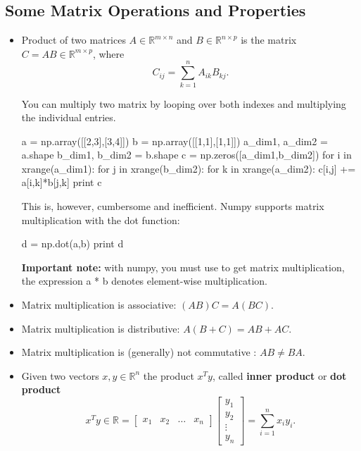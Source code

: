 \subsection{Some Matrix Operations and Properties}
\begin{itemize}
\item Product of two matrices $A \in \mathbb{R}^{m\times n}$ and $B \in \mathbb{R}^{n\times p}$
is the matrix $C=AB \in \mathbb{R}^{m\times p}$, where 
\begin{equation*}
C_{ij}=\sum\limits_{k=1}^{n}A_{ik}B_{kj}.
\end{equation*}

\begin{exercise}
You can multiply two matrix by looping over both indexes and multiplying the individual entries.
\begin{python}
a = np.array([[2,3],[3,4]])
b = np.array([[1,1],[1,1]])
a_dim1, a_dim2 = a.shape
b_dim1, b_dim2 = b.shape
c = np.zeros([a_dim1,b_dim2])
for i in xrange(a_dim1):
   for j in xrange(b_dim2):
       for k in xrange(a_dim2):
          c[i,j] += a[i,k]*b[j,k]
print c
\end{python}

This is, however, cumbersome and inefficient. Numpy supports matrix
multiplication with the dot function:

\begin{python}
d = np.dot(a,b)
print d
\end{python}

\textbf{Important note:} with numpy, you must use  to get matrix
multiplication, the expression {a * b} denotes element-wise multiplication.
\end{exercise}

\item Matrix multiplication is associative: $(AB)C= A(BC)$.
\item Matrix multiplication is distributive: $A(B+C)= AB + AC$.
\item Matrix multiplication is (generally) not commutative : $AB \neq BA$.
\item Given two vectors $x,y \in \mathbb{R}^{n}$ the product $x^{T}y$, called {\bf inner product}
or {\bf dot product}
\begin{equation*}
x^{T}y \in \mathbb{R} = \left[\begin{array}{cccc}
x_{1}&x_{2}&\ldots&x_{n}\end{array}\right] \left[\begin{array}{c}
y_{1} \\
y_{2} \\
\vdots \\
y_{n}
\end{array}\right] = \sum\limits_{i=1}^{n}x_{i}y_{i}.
\end{equation*}


\end{itemize}
